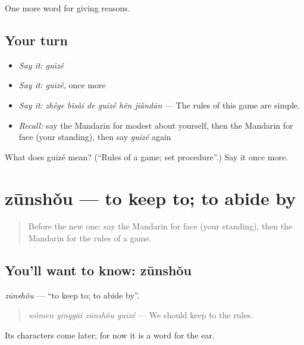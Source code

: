 \begin{grammarlens}[title={What you've built}]
One more word for giving reasons.
\end{grammarlens}

\subsection*{Your turn}
\begin{itemize}
\raggedright
  \item \emph{Say it:} \emph{guīzé}
  \item \emph{Say it:} \emph{guīzé}, once more
  \item \emph{Say it:} \emph{zhège bǐsài de guīzé hěn jiǎndān} — The rules of this game are simple.
  \item \emph{Recall:} say the Mandarin for modest about yourself, then the Mandarin for face (your standing), then say \emph{guīzé} again
\end{itemize}

\begin{tcolorbox}[breakable,colback=teal!4,colframe=teal!35!black,title={Before you move on}]
What does guīzé mean? (\textquotedblleft{}Rules of a game; set procedure\textquotedblright{}.) Say it once more.
\end{tcolorbox}
\section[zūnshǒu]{zūnshǒu — to keep to; to abide by}

\label{lesson:ZH-C359-zunshou}



\begin{quote}
Before the new one: say the Mandarin for face (your standing), then the Mandarin for the rules of a game.
\end{quote}

\subsection*{You'll want to know: zūnshǒu}
\emph{zūnshǒu} — \textquotedblleft{}to keep to; to abide by\textquotedblright{}.

\begin{quote}
\emph{wǒmen yīnggāi zūnshǒu guīzé} — We should keep to the rules.
\end{quote}

Its characters come later; for now it is a word for the ear.

